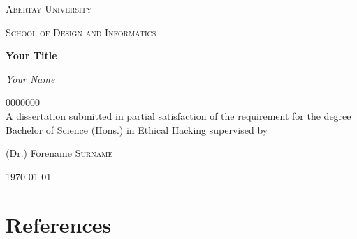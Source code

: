 \documentclass[12pt,a4paper]{article}
\begin{document}
    \begin{titlepage}
      \centering
		{\scshape\LARGE Abertay University \par} %
		\vspace{1cm}
		{\scshape School of Design and Informatics \par}
		\vspace{1.5cm}
		{\Large\bfseries Your Title\par}
		\vspace{4cm}
		{\Large\itshape Your Name\par}
		0000000 %
		\\
		\vfill
		A dissertation submitted in partial satisfaction of the requirement for the degree Bachelor of Science (Hons.) in Ethical Hacking
		\vfill
		supervised by\par
		(Dr.) Forename \textsc{Surname}
		\vfill
		{\large \today\par}  
    \end{titlepage}

    
        
    \tableofcontents
    \clearpage
    \listoffigures
    \clearpage
    \listoftables
    \clearpage

    
    
    
    
    
    

    \section{References}
        \printbibliography[heading=none]

    
\end{document}

